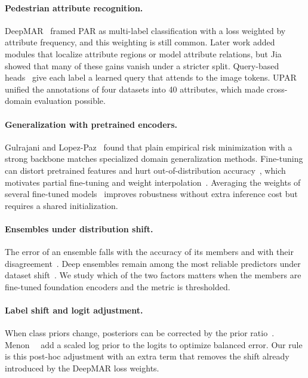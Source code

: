 \documentclass[10pt,twocolumn,letterpaper]{article}
\begin{document}
\paragraph{Pedestrian attribute recognition.} DeepMAR~\cite{deepmar} framed PAR as multi-label classification with a loss weighted by attribute frequency, and this weighting is still common. Later work added modules that localize attribute regions or model attribute relations, but Jia~\etal~\cite{rethinkpar} showed that many of these gains vanish under a stricter split. Query-based heads~\cite{q2l,mldecoder} give each label a learned query that attends to the image tokens. UPAR~\cite{upar} unified the annotations of four datasets into 40 attributes, which made cross-domain evaluation possible.

\paragraph{Generalization with pretrained encoders.} Gulrajani and Lopez-Paz~\cite{domainbed} found that plain empirical risk minimization with a strong backbone matches specialized domain generalization methods. Fine-tuning can distort pretrained features and hurt out-of-distribution accuracy~\cite{lpft}, which motivates partial fine-tuning and weight interpolation~\cite{wiseft}. Averaging the weights of several fine-tuned models~\cite{soups,diwa} improves robustness without extra inference cost but requires a shared initialization.

\paragraph{Ensembles under distribution shift.} The error of an ensemble falls with the accuracy of its members and with their disagreement~\cite{krogh}. Deep ensembles remain among the most reliable predictors under dataset shift~\cite{deepens,ovadia}. We study which of the two factors matters when the members are fine-tuned foundation encoders and the metric is thresholded.

\paragraph{Label shift and logit adjustment.} When class priors change, posteriors can be corrected by the prior ratio~\cite{saerens,lipton}. Menon~\etal~\cite{logitadj} add a scaled log prior to the logits to optimize balanced error. Our rule is this post-hoc adjustment with an extra term that removes the shift already introduced by the DeepMAR loss weights.
\end{document}
